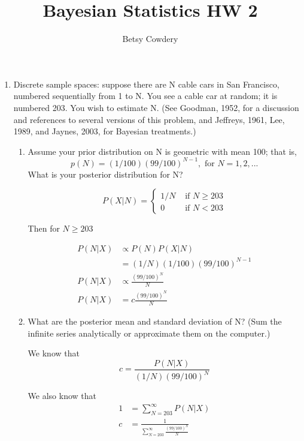 \documentclass[11pt]{article}
\newcommand{\tfor}{\text{ for }}
\newcommand{\tif}{\text{ if }}
\theoremstyle{definition}
\theoremstyle{remark}
\theoremstyle{definition}
\begin{document}
\author{Betsy Cowdery}
\title{Bayesian Statistics HW 2}
\date{}
\maketitle

\begin{enumerate}
	\item Discrete sample spaces: suppose there are N cable cars in San Francisco, numbered sequentially from 1 to N. You see a cable car at random; it is numbered 203. You wish to estimate N. (See Goodman, 1952, for a discussion and references to several versions of this problem, and Jeffreys, 1961, Lee, 1989, and Jaynes, 2003, for Bayesian treatments.)
	\begin{enumerate}
		\item Assume your prior distribution on N is geometric with mean 100; that is,
			$$p(N) = (1/100)(99/100)^{N-1}, \tfor N= 1,2,...$$
			What is your posterior distribution for N?
			
				\[ P(X|N) =  \left\{  
					\begin{array}{ll}
						1/N & \tif N \geq 203 \\
						0 & \tif N < 203
					\end{array}
				\right. \]
			
			Then for $N \geq 203$
			
			\begin{align*}
				P(N|X) &\propto P(N)P(X|N)\\
						&= (1/N)(1/100)(99/100)^{N-1} \\
				P(N|X) &\propto \frac{(99/100)^N}{N}\\
				P(N|X)  &= c \frac{(99/100)^N}{N}
			\end{align*}
			 			
		\item What are the posterior mean and standard deviation of N? (Sum the infinite series analytically or approximate them on the computer.)
		
		We know that $$c = \frac{P(N|X)}{(1/N)(99/100)^N}$$
		
		We also know that 
			\begin{align*}
				1 &= \sum_{N=203}^\infty P(N|X) \\
				c &= \frac{1}{\sum_{N=203}^\infty \frac{(99/100)^N}{N}}
			\end{align*}
			

\end{enumerate}
\end{enumerate}
\end{document}
